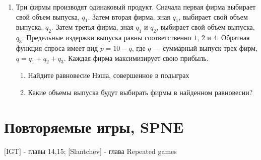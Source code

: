 \documentclass[pdftex,12pt,a4paper]{article}
\begin{document}
\begin{enumerate}
\item  Три фирмы производят одинаковый продукт. Сначала первая фирма выбирает свой объем выпуска, $q_1$. Затем вторая фирма, зная $q_1$, выбирает свой объем выпуска, $q_2$. Затем третья фирма, зная $q_1$ и $q_2$, выбирает свой объем выпуска, $q_3$. Предельные издержки выпуска равны соответственно $1$, $2$ и $4$. Обратная функция спроса имеет вид $p=10-q$, где $q$ --- суммарный выпуск трех фирм, $q=q_1+q_2+q_3$. Каждая фирма максимизирует свою прибыль.
\begin{enumerate}
\item Найдите равновесие Нэша, совершенное в подыграх
\item Какие объемы выпуска будут выбирать фирмы в найденном равновесии?
\end{enumerate}

\end{enumerate}

\section{Повторяемые игры, SPNE} 

$[$IGT$]$ - главы 14,15; $[$Slantchev$]$ - глава Repeated games \\
\end{document}
